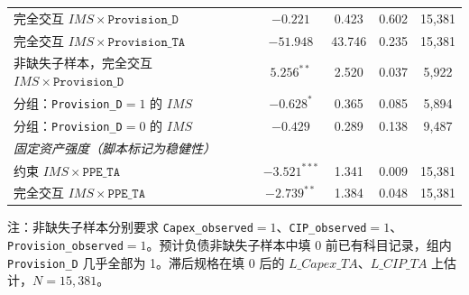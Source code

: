 \documentclass[11pt]{article}
\begin{document}
\begin{center}
\begin{threeparttable}
\begin{tabular}{lcccc}
完全交互 \(IMS\times\texttt{Provision\_D}\) & \(-0.221\) & 0.423 & 0.602 & 15,381 \\
完全交互 \(IMS\times\texttt{Provision\_TA}\) & \(-51.948\) & 43.746 & 0.235 & 15,381 \\
非缺失子样本，完全交互 \(IMS\times\texttt{Provision\_D}\) & \(5.256^{**}\) & 2.520 & 0.037 & 5,922 \\
分组：\texttt{Provision\_D}\(=1\) 的 \(IMS\) & \(-0.628^{*}\) & 0.365 & 0.085 & 5,894 \\
分组：\texttt{Provision\_D}\(=0\) 的 \(IMS\) & \(-0.429\) & 0.289 & 0.138 & 9,487 \\
\midrule
\multicolumn{5}{l}{\textit{固定资产强度（脚本标记为稳健性）}} \\
约束 \(IMS\times\texttt{PPE\_TA}\) & \(-3.521^{***}\) & 1.341 & 0.009 & 15,381 \\
完全交互 \(IMS\times\texttt{PPE\_TA}\) & \(-2.739^{**}\) & 1.384 & 0.048 & 15,381 \\
\bottomrule
\end{tabular}
\begin{tablenotes}\footnotesize
\item 注：非缺失子样本分别要求 \texttt{Capex\_observed}\(=1\)、\texttt{CIP\_observed}\(=1\)、\texttt{Provision\_observed}\(=1\)。预计负债非缺失子样本中填 0 前已有科目记录，组内 \texttt{Provision\_D} 几乎全部为 1。滞后规格在填 0 后的 \(L\_Capex\_TA\)、\(L\_CIP\_TA\) 上估计，\(N=15{,}381\)。
\end{tablenotes}
\end{threeparttable}
\end{center}
\end{document}
